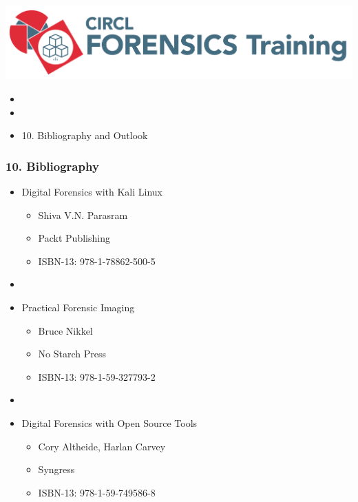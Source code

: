 

\begin{frame}
    \includegraphics[scale=0.3]{images/logo-circl-Forensics.png}
    \begin{itemize}
        \item[]
        \item[]
        \item[] 10. Bibliography and Outlook
    \end{itemize}
\end{frame}


\begin{frame}[fragile]
  \frametitle{10. Bibliography}
  \begin{itemize}
      \item Digital Forensics with Kali Linux
        \begin{itemize}
            \item[] Shiva V.N. Parasram
            \item[] Packt Publishing
            \item[] ISBN-13: 978-1-78862-500-5
        \end{itemize}
      \item[]
      \item Practical Forensic Imaging
        \begin{itemize}
            \item[] Bruce Nikkel
            \item[] No Starch Press
            \item[] ISBN-13: 978-1-59-327793-2
        \end{itemize}
      \item[]
      \item Digital Forensics with Open Source Tools
        \begin{itemize}
            \item[] Cory Altheide, Harlan Carvey
            \item[] Syngress
            \item[] ISBN-13: 978-1-59-749586-8
        \end{itemize}
  \end{itemize}
\end{frame}



